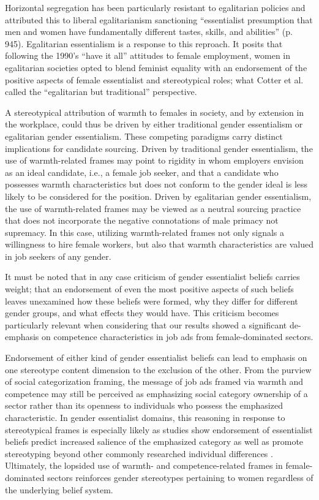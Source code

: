 \documentclass[jou]{apa7}
\begin{document}
Horizontal segregation has been particularly resistant to egalitarian policies and \textcite{charlesEgalitarianismGenderInequality2011} attributed this to liberal egalitarianism sanctioning “essentialist presumption that men and women have fundamentally different tastes, skills, and abilities” (p. 945). Egalitarian essentialism is a response to this reproach. It posits that following the 1990’s “have it all” attitudes to female employment, women in egalitarian societies opted to blend feminist equality with an endorsement of the positive aspects of female essentialist and stereotypical roles; what Cotter et al. called the “egalitarian but traditional” perspective.

A stereotypical attribution of warmth to females in society, and by extension in the workplace, could thus be driven by either traditional gender essentialism or egalitarian gender essentialism. These competing paradigms carry distinct implications for candidate sourcing. Driven by traditional gender essentialism, the use of warmth-related frames may point to rigidity in whom employers envision as an ideal candidate, i.e., a female job seeker, and that a candidate who possesses warmth characteristics but does not conform to the gender ideal is less likely to be considered for the position. Driven by egalitarian gender essentialism, the use of warmth-related frames may be viewed as a neutral sourcing practice that does not incorporate the negative connotations of male primacy not supremacy. In this case, utilizing warmth-related frames not only signals a willingness to hire female workers, but also that warmth characteristics are valued in job seekers of any gender.

It must be noted that in any case \textcite{cotterEndGenderRevolution2011} criticism of gender essentialist beliefs carries weight; that an endorsement of even the most positive aspects of such beliefs leaves unexamined how these beliefs were formed, why they differ for different gender groups, and what effects they would have. This criticism becomes particularly relevant when considering that our results showed a significant de-emphasis on competence characteristics in job ads from female-dominated sectors.

Endorsement of either kind of gender essentialist beliefs can lead to emphasis on one stereotype content dimension to the exclusion of the other. From the purview of social categorization framing, the message of job ads framed via warmth and competence may still be perceived as emphasizing social category ownership of a sector rather than its openness to individuals who possess the emphasized characteristic. In gender essentialist domains, this reasoning in response to stereotypical frames is especially likely as studies show endorsement of essentialist beliefs predict increased salience of the emphasized category as well as promote stereotyping beyond other commonly researched individual differences \parencite{bastianPsychologicalEssentialismStereotype2006,leichtCounterStereotypesFeminismPromote2017,paukerRaceSalienceEssentialist2010}. Ultimately, the lopsided use of warmth- and competence-related frames in female-dominated sectors reinforces gender stereotypes pertaining to women regardless of the underlying belief system.
\end{document}
